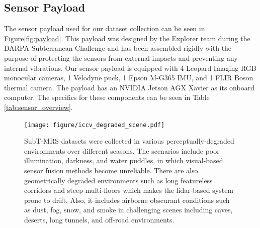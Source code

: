 \documentclass[10pt,twocolumn,letterpaper]{article}
\begin{document}
\subsection{Sensor Payload}


The sensor payload used for our dataset collection can be seen in Figure\ref{fig:payload}. This payload was designed by the Explorer team during the DARPA Subterranean Challenge and has been assembled rigidly with the purpose of protecting the sensors from external impacts and preventing any internal vibrations. Our sensor payload is equipped with 4 Leopard Imaging RGB monocular cameras, 1 Velodyne puck, 1 Epson M-G365 IMU, and 1 FLIR Boson thermal camera. The payload has an NVIDIA Jetson AGX Xavier as its onboard computer. The specifics for these components can be seen in Table \ref{tab:sensor_overview}.


\begin{figure} []
   \centering
    \texttt{[image: figure/iccv\_degraded\_scene.pdf]}

    \caption{SubT-MRS datasets were collected in various perceptually-degraded environments over different seasons. The scenarios include poor illumination, darkness, and water puddles, in which visual-based sensor fusion methods become unreliable. There are also geometrically degraded environments such as long featureless corridors and steep multi-floors which makes the lidar-based system prone to drift. Also, it includes airborne obscurant conditions such as dust, fog, snow, and smoke in challenging scenes including caves, deserts, long tunnels, and off-road environments.} 
    \label{fig:various_terrains}
\end{figure}
\end{document}
